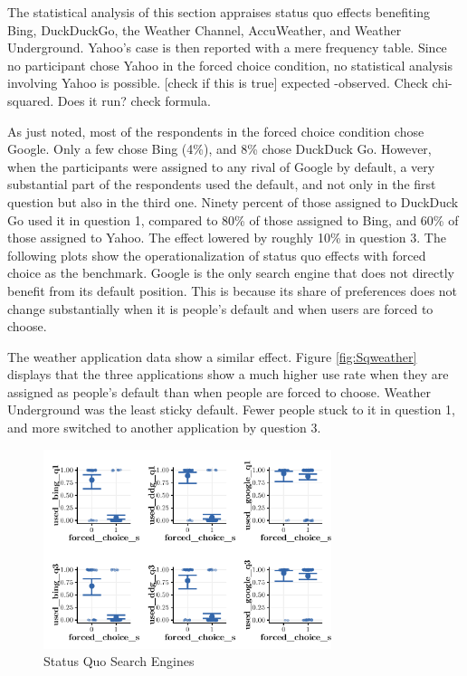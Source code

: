 \documentclass[
  11pt,
]{article}
\begin{document}
The statistical analysis of this section appraises status quo effects benefiting Bing, DuckDuckGo, the Weather Channel, AccuWeather, and Weather Underground. Yahoo's case is then reported with a mere frequency table. Since no participant chose Yahoo in the forced choice condition, no statistical analysis involving Yahoo is possible. {[}check if this is true{]} expected -observed. Check chi-squared. Does it run? check formula.

As just noted, most of the respondents in the forced choice condition chose Google. Only a few chose Bing (4\%), and 8\% chose DuckDuck Go. However, when the participants were assigned to any rival of Google by default, a very substantial part of the respondents used the default, and not only in the first question but also in the third one. Ninety percent of those assigned to DuckDuck Go used it in question 1, compared to 80\% of those assigned to Bing, and 60\% of those assigned to Yahoo. The effect lowered by roughly 10\% in question 3. The following plots show the operationalization of status quo effects with forced choice as the benchmark. Google is the only search engine that does not directly benefit from its default position. This is because its share of preferences does not change substantially when it is people's default and when users are forced to choose.

The weather application data show a similar effect. Figure \ref{fig:Sqweather} displays that the three applications show a much higher use rate when they are assigned as people's default than when people are forced to choose. Weather Underground was the least sticky default. Fewer people stuck to it in question 1, and more switched to another application by question 3.

\begin{figure}

{\centering \includegraphics[width=0.75\textwidth]{Results-July25_files/figure-latex/Sqsearch-1} 

}

\caption{Status Quo Search Engines}\label{fig:Sqsearch}
\end{figure}
\end{document}
